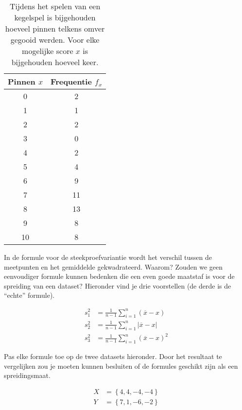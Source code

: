 \begin{table}
  \centering
  \begin{tabular}{cc}
  	\toprule
  	Pinnen $x$ & Frequentie $f_{x}$ \\
  	\midrule
  	    0      &         2          \\
  	    1      &         1          \\
  	    2      &         2          \\
  	    3      &         0          \\
  	    4      &         2          \\
  	    5      &         4          \\
  	    6      &         9          \\
  	    7      &         11         \\
  	    8      &         13         \\
  	    9      &         8          \\
  	    10     &         8          \\
  	\bottomrule
  \end{tabular}
  \caption{Tijdens het spelen van een kegelspel is bijgehouden hoeveel pinnen telkens omver gegooid werden. Voor elke mogelijke score $x$ is bijgehouden hoeveel keer.}
  \label{tab:pinfreq}
\end{table}

\begin{exercise}
  \label{ex:variance-formula}
  In de formule voor de steekproefvariantie wordt het verschil tussen de meetpunten en het gemiddelde gekwadrateerd. Waarom? Zouden we geen eenvoudiger formule kunnen bedenken die een even goede maatstaf is voor de spreiding van een dataset? Hieronder vind je drie voorstellen (de derde is de ``echte'' formule).

  \begin{align}
    s^{2}_{1} &= \frac{1}{n-1} \sum_{i=1}^{n} (\overline{x} - x) \\
    s^{2}_{2} &= \frac{1}{n-1} \sum_{i=1}^{n} \left| \overline{x} - x\right| \\
    s^{2}_{3} &= \frac{1}{n-1} \sum_{i=1}^{n} (\overline{x} - x)^{2}
  \end{align}

  Pas elke formule toe op de twee datasets hieronder. Door het resultaat te vergelijken zou je moeten kunnen besluiten of de formules geschikt zijn als een spreidingsmaat.
  
  \begin{align*}
    X &= \left\{ 4,4,-4,-4 \right\} \\
    Y &= \left\{ 7,1,-6,-2 \right\}
  \end{align*}

\end{exercise}

